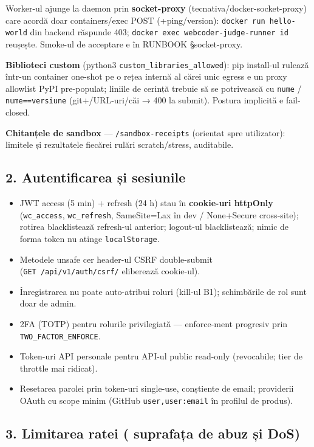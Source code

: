 \documentclass[
]{article}
\providecommand{\tightlist}{%
  \setlength{\itemsep}{0pt}\setlength{\parskip}{0pt}}
\begin{document}
Worker-ul ajunge la daemon prin \textbf{socket-proxy}
(tecnativa/docker-socket-proxy) care acordă doar containers/exec POST
(+ping/version): \texttt{docker\ run\ hello-world} din backend răspunde
403; \texttt{docker\ exec\ webcoder-judge-runner\ id} reușește. Smoke-ul
de acceptare e în RUNBOOK §socket-proxy.

\textbf{Biblioteci custom} (python3
\texttt{custom\_libraries\_allowed}): pip install-ul rulează într-un
container one-shot pe o rețea internă al cărei unic egress e un proxy
allowlist PyPI pre-populat; liniile de cerință trebuie să se potrivească
cu \texttt{nume} / \texttt{nume==versiune} (git+/URL-uri/căi → 400 la
submit). Postura implicită e fail-closed.

\textbf{Chitanțele de sandbox} --- \texttt{/sandbox-receipts} (orientat
spre utilizator): limitele și rezultatele fiecărei rulări
scratch/stress, auditabile.

\subsection{2. Autentificarea și
sesiunile}\label{2-autentificarea-ux219i-sesiunile}

\begin{itemize}
\tightlist
\item
  JWT access (5 min) + refresh (24 h) stau în \textbf{cookie-uri
  httpOnly} (\texttt{wc\_access}, \texttt{wc\_refresh}, SameSite=Lax în
  dev / None+Secure cross-site); rotirea blacklistează refresh-ul
  anterior; logout-ul blacklistează; nimic de forma token nu atinge
  \texttt{localStorage}.
\item
  Metodele unsafe cer header-ul CSRF double-submit
  (\texttt{GET\ /api/v1/auth/csrf/} eliberează cookie-ul).
\item
  Înregistrarea nu poate auto-atribui roluri (kill-ul B1); schimbările
  de rol sunt doar de admin.
\item
  2FA (TOTP) pentru rolurile privilegiată --- enforce-ment progresiv
  prin \texttt{TWO\_FACTOR\_ENFORCE}.
\item
  Token-uri API personale pentru API-ul public read-only (revocabile;
  tier de throttle mai ridicat).
\item
  Resetarea parolei prin token-uri single-use, conștiente de email;
  providerii OAuth cu scope minim (GitHub \texttt{user,user:email} în
  profilul de produs).
\end{itemize}

\subsection{3. Limitarea ratei ( suprafața de abuz și
DoS)}\label{3-limitarea-ratei--suprafaux21ba-de-abuz-ux219i-dos}
\end{document}
